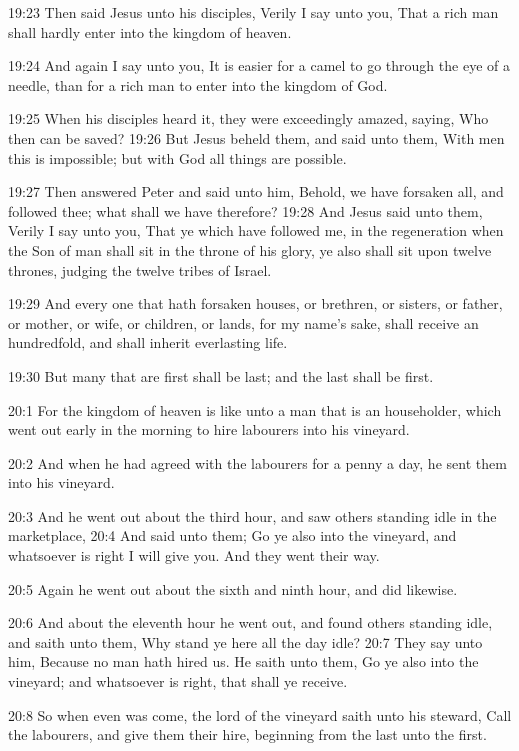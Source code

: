 19:23 Then said Jesus unto his disciples, Verily I say unto you, That a rich man shall hardly enter into the kingdom of heaven.

19:24 And again I say unto you, It is easier for a camel to go through the eye of a needle, than for a rich man to enter into the kingdom of God.

19:25 When his disciples heard it, they were exceedingly amazed, saying, Who then can be saved?  19:26 But Jesus beheld them, and said unto them, With men this is impossible; but with God all things are possible.

19:27 Then answered Peter and said unto him, Behold, we have forsaken all, and followed thee; what shall we have therefore?  19:28 And Jesus said unto them, Verily I say unto you, That ye which have followed me, in the regeneration when the Son of man shall sit in the throne of his glory, ye also shall sit upon twelve thrones, judging the twelve tribes of Israel.

19:29 And every one that hath forsaken houses, or brethren, or sisters, or father, or mother, or wife, or children, or lands, for my name's sake, shall receive an hundredfold, and shall inherit everlasting life.

19:30 But many that are first shall be last; and the last shall be first.

20:1 For the kingdom of heaven is like unto a man that is an householder, which went out early in the morning to hire labourers into his vineyard.

20:2 And when he had agreed with the labourers for a penny a day, he sent them into his vineyard.

20:3 And he went out about the third hour, and saw others standing idle in the marketplace, 20:4 And said unto them; Go ye also into the vineyard, and whatsoever is right I will give you. And they went their way.

20:5 Again he went out about the sixth and ninth hour, and did likewise.

20:6 And about the eleventh hour he went out, and found others standing idle, and saith unto them, Why stand ye here all the day idle?  20:7 They say unto him, Because no man hath hired us. He saith unto them, Go ye also into the vineyard; and whatsoever is right, that shall ye receive.

20:8 So when even was come, the lord of the vineyard saith unto his steward, Call the labourers, and give them their hire, beginning from the last unto the first.

